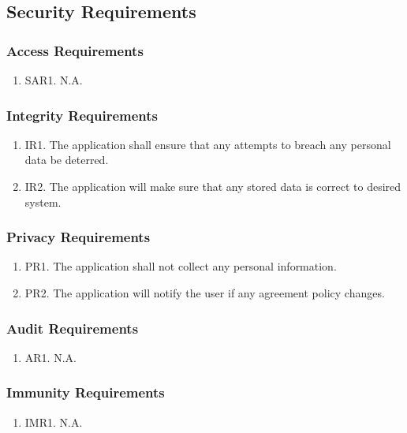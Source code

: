 \documentclass[]{article}
\begin{document}
\subsection{Security Requirements}
\subsubsection{Access Requirements}
\begin{enumerate}
	\item SAR1. N.A.
\end{enumerate}

\subsubsection{Integrity Requirements}
\begin{enumerate}
	\item IR1. The application shall ensure that any attempts to breach any personal data be deterred.
	\item IR2. The application will make sure that any stored data is correct to desired system.
\end{enumerate}

\subsubsection{Privacy Requirements}
\begin{enumerate}
	\item PR1. The application shall not collect any personal information.
	\item PR2. The application will notify the user if any agreement policy changes.
\end{enumerate}

\subsubsection{Audit Requirements}
\begin{enumerate}
	\item AR1. N.A.
\end{enumerate}

\subsubsection{Immunity Requirements}
\begin{enumerate}
	\item IMR1. N.A.
\end{enumerate}
\end{document}
